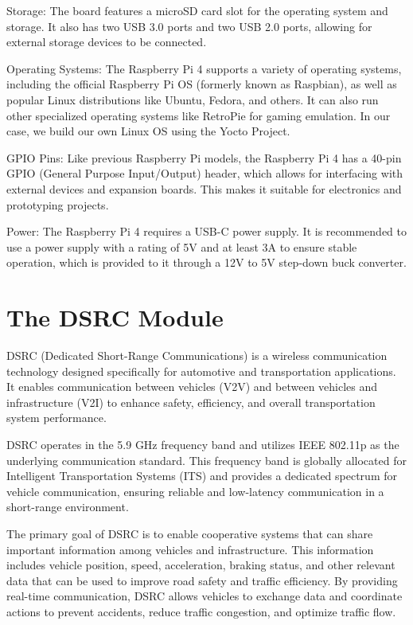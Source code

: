 \documentclass[
12pt,
oneside, 
onehalfspacing, 
nolistspacing, 
parskip, 
chapterinoneline, 
]{AASTCOMPUTER}
\begin{document}
Storage: The board features a microSD card slot for the operating system and storage. It also has two USB 3.0 ports and two USB 2.0 ports, allowing for external storage devices to be connected.

Operating Systems: The Raspberry Pi 4 supports a variety of operating systems, including the official Raspberry Pi OS (formerly known as Raspbian), as well as popular Linux distributions like Ubuntu, Fedora, and others. It can also run other specialized operating systems like RetroPie for gaming emulation. In our case, we build our own Linux OS using the Yocto Project.

GPIO Pins: Like previous Raspberry Pi models, the Raspberry Pi 4 has a 40-pin GPIO (General Purpose Input/Output) header, which allows for interfacing with external devices and expansion boards. This makes it suitable for electronics and prototyping projects.

Power: The Raspberry Pi 4 requires a USB-C power supply. It is recommended to use a power supply with a rating of 5V and at least 3A to ensure stable operation, which is provided to it through a 12V to 5V step-down buck converter.

\section{The DSRC Module}
DSRC (Dedicated Short-Range Communications) is a wireless communication technology designed specifically for automotive and transportation applications. It enables communication between vehicles (V2V) and between vehicles and infrastructure (V2I) to enhance safety, efficiency, and overall transportation system performance.

DSRC operates in the 5.9 GHz frequency band and utilizes IEEE 802.11p as the underlying communication standard. This frequency band is globally allocated for Intelligent Transportation Systems (ITS) and provides a dedicated spectrum for vehicle communication, ensuring reliable and low-latency communication in a short-range environment.

The primary goal of DSRC is to enable cooperative systems that can share important information among vehicles and infrastructure. This information includes vehicle position, speed, acceleration, braking status, and other relevant data that can be used to improve road safety and traffic efficiency. By providing real-time communication, DSRC allows vehicles to exchange data and coordinate actions to prevent accidents, reduce traffic congestion, and optimize traffic flow.
\end{document}
